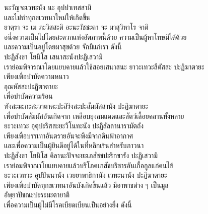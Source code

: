 \documentclass{article}
\begin{document}
นะวัญจะเวทะนัง นะ อุปปาเทสสามิ\\
\indent และไม่ทำทุกขเวทนาใหม่ให้เกิดขึ้น\\
ยาตฺรา จะ เม ภะวิสสะติ อะนะวัชชะตา จะ ผาสุวิหาโร จาติ\\
\indent อนึ่งความเป็นไปโดยสะดวกแห่งอัตภาพนี้ด้วย ความเป็นผู้หาโทษมิได้ด้วย\\ และความเป็นอยู่โดยผาสุขด้วย จักมีแก่เรา ดังนี้\\
ปะฏิสังขา โยนิโส เสนาสะนังปะฏิเสวามิ\\
\indent เราย่อมพิจารณาโดยแยบคายแล้วใช้สอยเสนาสนะ
ยาวะเทวะสีตัสสะ ปะฏิฆาตายะ\\
\indent เพียงเพื่อบำบัดความหนาว\\
อุณหัสสะปะฏิฆาตายะ\\
\indent เพื่อบำบัดความร้อน\\
ฑังสะมะกะสะวาตาตะปะสิริงสะปะสัมผัสสานัง ปะฏิฆาตายะ\\
\indent เพื่อบำบัดสัมผัสอันเกิดจาก เหลือบยุงลมแดดและสัตว์เลื้อยคลานทั้งหลาย\\
ยะวะเทวะ อุตุปะริสสะยะวิโนทะนัง ปะฏิสัลลานารามัตถัง\\
\indent เพียงเพื่อบรรเทาอันตรายอันจะพึงมีจากดินฟ้าอากาศ\\ และเพื่อความเป็นผู้ยินดีอยู่ได้ในที่หลีกเร้นสำหรับภาวนา\\
ปะฏิสังขา โยนิโส คิลานะปัจจะยะเภสัชชปะริกขารัง ปะฏิเสวามิ\\
\indent เราย่อมพิจาณาโยแยบคายแล้วบริโภคเภสัชบริชารอันเกื้อกูลแก่คนไข้\\
ยะวะเวทวะ อุปปันนานัง เวยยาพาธิกานัง เวทะนานัง ปะฏิฆาตายะ\\
\indent เพียงเพื่อบำบัดทุกขเวทนาอันบังเกิดขึ้นแล้ว มีอาพาธต่าง ๆ เป็นมูล\\
อัพฺยาปัชณะปะระมะตายาติ\\
\indent เพื่อความเป็นผู้ไม่มีโรคเบียดเบียนเป็นอย่างยิ่ง ดังนี้\\
\end{document}
